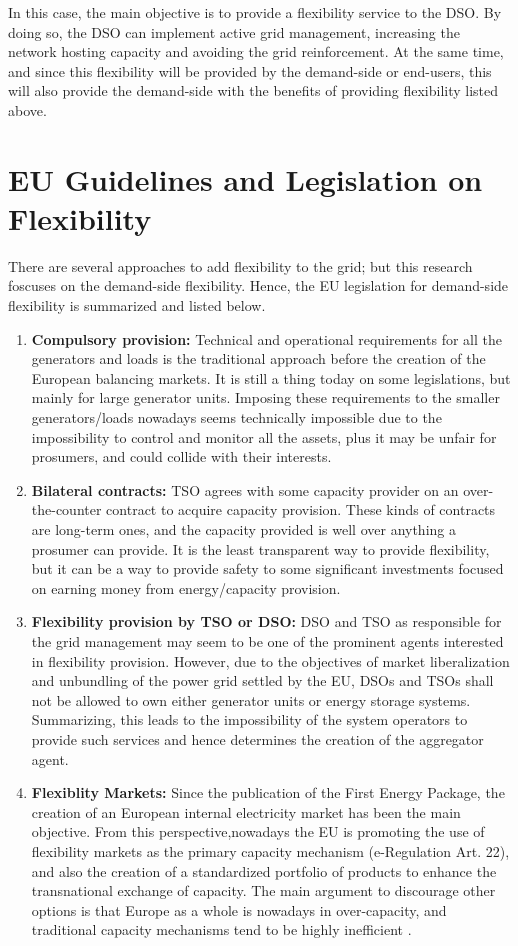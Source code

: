 In this case, the main objective is to provide a flexibility service to the DSO. By doing so, the DSO can implement active grid management, increasing the network hosting capacity and avoiding the grid reinforcement. At the same time, and since this flexibility will be provided by the demand-side or end-users, this will also provide the demand-side with the benefits of providing flexibility listed above. 

\section{EU Guidelines and Legislation on Flexibility}
There are several approaches to add flexibility to the grid; but this research foscuses on the demand-side flexibility. Hence, the EU legislation for demand-side flexibility is summarized and listed below. 

\begin{enumerate}
\item \textbf{Compulsory provision:} Technical and operational requirements for all the generators and loads is the traditional approach before the creation of the European balancing markets. It is still a thing today on some legislations, but mainly for large generator units. Imposing these requirements to the smaller generators/loads nowadays seems technically impossible due to the impossibility to control and monitor all the assets, plus it may be unfair for prosumers, and could collide with their interests.
\item \textbf{Bilateral contracts:} TSO agrees with some capacity provider on an over-the-counter contract to acquire capacity provision. These kinds of contracts are long-term ones, and the capacity provided is well over anything a prosumer can provide. It is the least transparent way to provide flexibility, but it can be a way to provide safety to some significant investments focused on earning money from energy/capacity provision. 
\item  \textbf{Flexibility provision by TSO or DSO:} DSO and TSO as responsible for the grid management may seem to be one of the prominent agents interested in flexibility provision. However, due to the objectives of market liberalization and unbundling of the power grid settled by the EU, DSOs and TSOs shall not be allowed to own either generator units or energy storage systems. Summarizing, this leads to the impossibility of the system operators to provide such services and hence determines the creation of the aggregator agent.  
\item  \textbf{Flexiblity Markets:} Since the publication of the First Energy Package, the creation of an European internal electricity market has been the main objective. From this perspective,nowadays the EU is promoting the use of flexibility markets as the primary capacity mechanism \cite{Directive2019943} (e-Regulation Art. 22), and also the creation of a standardized portfolio of products to enhance the transnational exchange of capacity. The main argument to discourage other options is that Europe as a whole is nowadays in over-capacity, and traditional capacity mechanisms tend to be highly inefficient \cite{Hancher2017, validzic2017clean}.
\end{enumerate}

